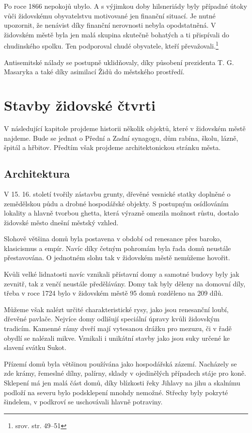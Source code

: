 \documentclass[a4paper,oneside,12pt]{report}
\begin{document}
Po roce 1866 nepokojů ubylo.
A s výjimkou doby hilsneriády byly případné útoky vůči židovskému obyvatelstvu motivované jen finanční situací.
Je nutné upozornit, že nenávist díky finanční nerovnosti nebyla opodstatněná.
V židovském městě byla jen malá skupina skutečně bohatých a ti přispívali do chudinského spolku.
Ten podporoval chudé obyvatele, kteří převažovali.\footnote{srov. \cite{Svobodva2015} str. 49--51}

Antisemitské nálady se postupně uklidňovaly, díky působení prezidenta T. G. Masaryka a také díky asimilací Židů do městského prostředí.

\chapter{Stavby židovské čtvrti}

V následující kapitole projdeme historii několik objektů, které v židovském městě najdeme.
Bude se jednat o Přední a Zadní synagogu, dům rabína, školu, lázně, špitál a hřbitov.
Předtím však projdeme architektonickou stránku města.

\section{Architektura}

V 15. 16. století tvořily zástavbu grunty, dřevěné vesnické statky doplněné o zemědělskou půdu a drobné hospodářské objekty.
S postupným osídlováním lokality a hlavně tvorbou ghetta, která výrazně omezila možnost růstu, dostalo židovské město  dnešní městský vzhled.

Slohově většina domů byla postavena v období od renesance přes baroko, klasicismus a empír.
Navíc díky četným pohromám byla řada domů neustále přestavována.
O jednotném slohu tak v židovském městě nemůžeme hovořit.

Kvůli velké lidnatosti navíc vznikali přístavní domy a samotné budovy byly jak zevnitř, tak z venčí neustále předělávány.
Domy tak byly děleny na domovní díly, třeba v roce 1724 bylo v židovském městě 95 domů rozděleno na 209 dílů.

Můžeme však nalézt určité charakteristické rysy, jako jsou renesanční loubí, dřevěné pavlače.
Nejvíce domy odlišují speciální úpravy kvůli židovským tradicím.
Kamenné rámy dveří mají vytesanou drážku pro mezuzu, či v řadě obydlí se nalézali mikve.
Vznikali i unikátní stavby jako jsou suky určené ke slavení svátku Sukot.

Přízemí domů byla většinou používána jako hospodářská zázemí.
Nacházely se zde krámy, řemeslné dílny, palírny, sklady v ojedinělých případech stáje pro koně.
Sklepení má jen malá část domů, díky blízkosti řeky Jihlavy na jihu a skalnímu podloží na severu bylo podsklepení mnohdy nemožné.
Střechy byly pokryté šindelem, v podkroví se uschovávali hlavně potraviny.
\end{document}
